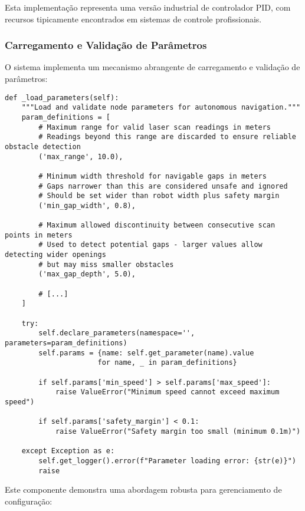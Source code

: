 Esta implementação representa uma versão industrial de controlador PID, com
recursos tipicamente encontrados em sistemas de controle profissionais.

\subsubsection{Carregamento e Validação de Parâmetros}

O sistema implementa um mecanismo abrangente de carregamento e validação de
parâmetros:

\begin{verbatim}
def _load_parameters(self):
    """Load and validate node parameters for autonomous navigation."""
    param_definitions = [
        # Maximum range for valid laser scan readings in meters
        # Readings beyond this range are discarded to ensure reliable obstacle detection
        ('max_range', 10.0),
        
        # Minimum width threshold for navigable gaps in meters
        # Gaps narrower than this are considered unsafe and ignored
        # Should be set wider than robot width plus safety margin
        ('min_gap_width', 0.8),
        
        # Maximum allowed discontinuity between consecutive scan points in meters
        # Used to detect potential gaps - larger values allow detecting wider openings
        # but may miss smaller obstacles
        ('max_gap_depth', 5.0),
        
        # [...]
    ]
    
    try:
        self.declare_parameters(namespace='', parameters=param_definitions)
        self.params = {name: self.get_parameter(name).value 
                      for name, _ in param_definitions}
        
        if self.params['min_speed'] > self.params['max_speed']:
            raise ValueError("Minimum speed cannot exceed maximum speed")
            
        if self.params['safety_margin'] < 0.1:
            raise ValueError("Safety margin too small (minimum 0.1m)")

    except Exception as e:
        self.get_logger().error(f"Parameter loading error: {str(e)}")
        raise
\end{verbatim}

Este componente demonstra uma abordagem robusta para gerenciamento de
configuração:


